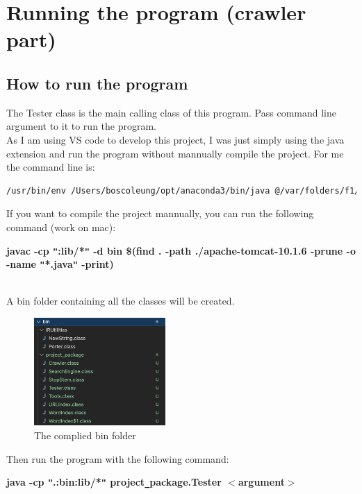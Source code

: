 \documentclass{article}
\begin{document}
    \newpage
    \section*{Running the program (crawler part)}
    \subsection*{How to run the program}
    
        The Tester class is the main calling class of this program. Pass command line argument to it to run the program. \\[0.4em]
        As I am using VS code to develop this project, I was just simply using the java extension and run the program without mannually compile the project. 
        For me the command line is:
        \begin{lstlisting}[language=bash,breaklines=true]
            /usr/bin/env /Users/boscoleung/opt/anaconda3/bin/java @/var/folders/f1/6mvnwxt109n9rswystbch0t40000gn/T/cp_dh97avm16bvprxybpew6los8v.argfile project_package.Tester <argument>
        \end{lstlisting}

        If you want to compile the project mannually, you can run the following command (work on mac): \\[0.8em]
        \centerline{\textbf{javac -cp \texttt{"}:lib/*\texttt{"} -d bin \$(find . -path ./apache-tomcat-10.1.6 -prune -o -name \texttt{"}*.java\texttt{"} -print)}} \\[0.1em]

        A bin folder containing all the classes will be created.
        \begin{figure}[!htbp]
            \centering
            \label{}
            \includegraphics[width=5cm]{compliedBin.png}
            \caption{The complied bin folder}
        \end{figure}

        Then run the program with the following command: \\[0.8em]
        \centerline{\textbf{java -cp \texttt{"}.:bin:lib/*\texttt{"} project\texttt{\_}package.Tester $<$argument$>$}}
\end{document}
